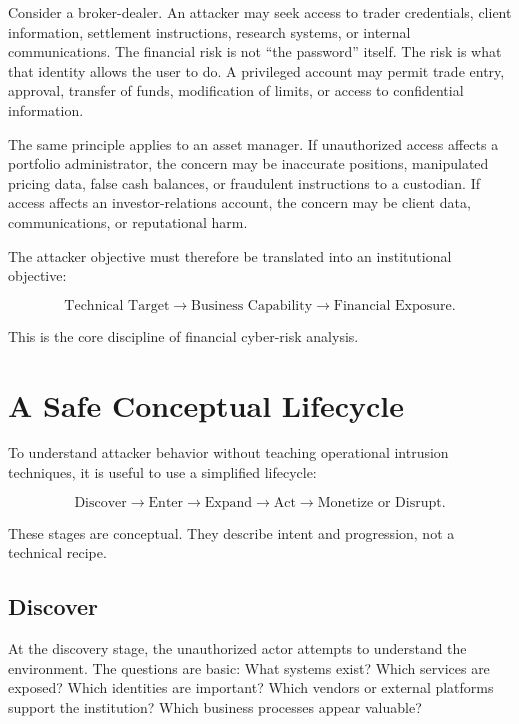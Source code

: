 Consider a broker-dealer. An attacker may seek access to trader credentials, client information, settlement instructions, research systems, or internal communications. The financial risk is not ``the password'' itself. The risk is what that identity allows the user to do. A privileged account may permit trade entry, approval, transfer of funds, modification of limits, or access to confidential information.

The same principle applies to an asset manager. If unauthorized access affects a portfolio administrator, the concern may be inaccurate positions, manipulated pricing data, false cash balances, or fraudulent instructions to a custodian. If access affects an investor-relations account, the concern may be client data, communications, or reputational harm.

The attacker objective must therefore be translated into an institutional objective:

\begin{equation}
\text{Technical Target}
\rightarrow
\text{Business Capability}
\rightarrow
\text{Financial Exposure}.
\end{equation}

This is the core discipline of financial cyber-risk analysis.

\section{A Safe Conceptual Lifecycle}

To understand attacker behavior without teaching operational intrusion techniques, it is useful to use a simplified lifecycle:

\begin{equation}
\text{Discover}
\rightarrow
\text{Enter}
\rightarrow
\text{Expand}
\rightarrow
\text{Act}
\rightarrow
\text{Monetize or Disrupt}.
\end{equation}

These stages are conceptual. They describe intent and progression, not a technical recipe.

\subsection{Discover}

At the discovery stage, the unauthorized actor attempts to understand the environment. The questions are basic: What systems exist? Which services are exposed? Which identities are important? Which vendors or external platforms support the institution? Which business processes appear valuable?

